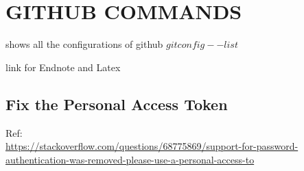 \section{GITHUB COMMANDS}
shows all the configurations of github
$git config --list$

link for Endnote and Latex

\subsection{Fix the Personal Access Token}
Ref:\\
\url{https://stackoverflow.com/questions/68775869/support-for-password-authentication-was-removed-please-use-a-personal-access-to}\\


